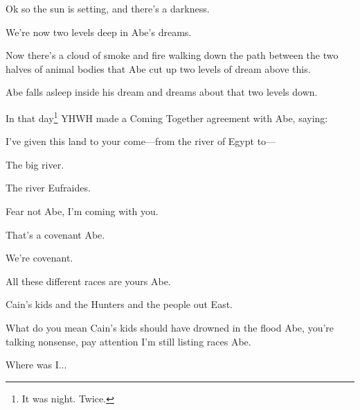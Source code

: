 {
}
{
}
{
	Ok so the sun is setting, and there's a darkness.

	We're now two levels deep in Abe's dreams.

	Now there's a cloud of smoke and fire walking down
	the path between the two halves of animal bodies
	that Abe cut up two levels of dream above this.

	Abe falls asleep inside his dream and dreams
	about that two levels down.

}

{
}
{
}
{
	In that day\footnote{It was night. Twice.}
	YHWH made a Coming Together agreement
	with Abe, saying:
	
	I’ve given this land to your come---from
	the river of Egypt to---
	
	The big river.

	The river Eufraides.

	Fear not Abe, I'm coming with you.

	That's a covenant Abe.

	We're covenant.

}

{
}
{
}
{
	All these different races are yours Abe.

	Cain's kids and the Hunters and the people out East.

	What do you mean Cain's kids should have drowned in
	the flood Abe, you're talking nonsense, pay attention
	I'm still listing races Abe.

	Where was I...
}

